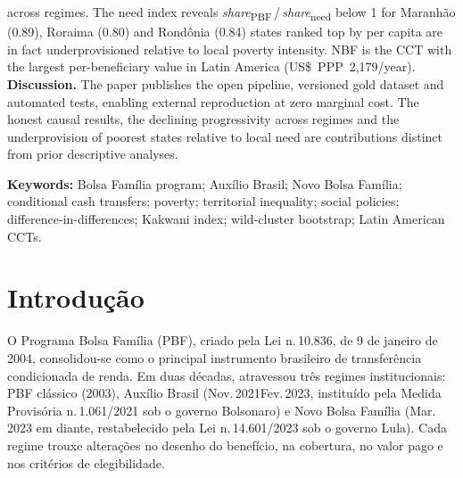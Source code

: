 \documentclass[12pt,a4paper,oneside]{article}
\begin{document}
\begin{singlespace}
across regimes. The need index reveals
\textit{share}\textsubscript{PBF}\,/\,\textit{share}\textsubscript{need}
below 1 for Maranhão (0.89), Roraima (0.80) and Rondônia (0.84)
\textemdash{} states ranked top by per capita are in fact
underprovisioned relative to local poverty intensity. NBF is the
CCT with the largest per-beneficiary value in Latin America
(US\$~PPP~2{,}179/year). \textbf{Discussion.} The paper publishes
the open pipeline, versioned gold dataset and automated tests,
enabling external reproduction at zero marginal cost. The honest
causal results, the declining progressivity across regimes and the
underprovision of poorest states relative to local need are
contributions distinct from prior descriptive analyses.

\vspace{0.4cm}\noindent\textbf{Keywords:}
Bolsa Família program; Auxílio Brasil; Novo Bolsa Família;
conditional cash transfers; poverty; territorial inequality;
social policies; difference-in-differences; Kakwani index;
wild-cluster bootstrap; Latin American CCTs.
\end{singlespace}

\newpage

\renewcommand{\contentsname}{Sumário}
\tableofcontents

\newpage
\renewcommand{\listfigurename}{Lista de Figuras}
\listoffigures

\vspace{1cm}
\renewcommand{\listtablename}{Lista de Tabelas}
\listoftables

\newpage

\section{Introdução}\label{sec:intro}

O Programa Bolsa Família (PBF), criado pela Lei n.\,10.836, de 9 de
janeiro de 2004, consolidou-se como o principal instrumento brasileiro
de transferência condicionada de renda. Em duas décadas, atravessou
três regimes institucionais: PBF clássico (2003),
Auxílio Brasil (Nov.\,2021\textendash Fev.\,2023, instituído pela
Medida Provisória n.\,1.061/2021 sob o governo Bolsonaro) e Novo
Bolsa Família (Mar.\,2023 em diante, restabelecido pela Lei
n.\,14.601/2023 sob o governo Lula). Cada regime trouxe alterações
no desenho do benefício, na cobertura, no valor pago e nos critérios
de elegibilidade.
\end{document}
